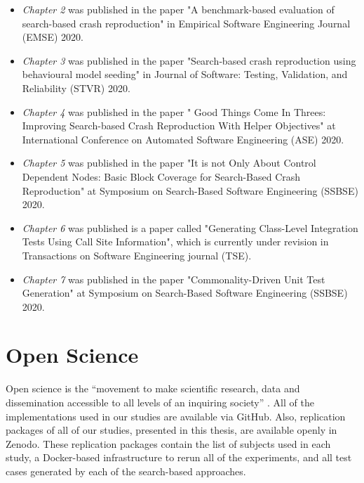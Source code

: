 \begin{itemize}
    \item \textit{Chapter 2} was published in the paper "A benchmark-based evaluation of search-based crash reproduction" in Empirical Software Engineering Journal (EMSE) 2020.
    \item \textit{Chapter 3} was published in the paper "Search‐based crash reproduction using behavioural model seeding" in Journal of Software: Testing, Validation, and Reliability (STVR) 2020.
    \item \textit{Chapter 4} was published in the paper " Good Things Come In Threes: Improving Search-based Crash Reproduction With Helper Objectives" at International Conference on Automated Software Engineering (ASE) 2020.
    \item \textit{Chapter 5} was published in the paper "It is not Only About Control Dependent Nodes: Basic Block Coverage for Search-Based Crash Reproduction" at Symposium on Search-Based Software Engineering (SSBSE) 2020.
    \item \textit{Chapter 6} was published is a paper called "Generating Class-Level Integration Tests Using Call Site Information", which is currently under revision in Transactions on Software Engineering journal (TSE).
    \item \textit{Chapter 7} was published in the paper "Commonality-Driven Unit Test Generation" at Symposium on Search-Based Software Engineering (SSBSE) 2020.
  \end{itemize}

\section{Open Science}

Open science is the “movement to make scientific research, data and dissemination accessible to all levels of an inquiring society” \cite{Open_science}. All of the implementations used in our studies are available via GitHub. Also, replication packages of all of our studies, presented in this thesis, are available openly in Zenodo. These replication packages contain the list of subjects used in each study, a Docker-based infrastructure to rerun all of the experiments, and all test cases generated by each of the search-based approaches.



